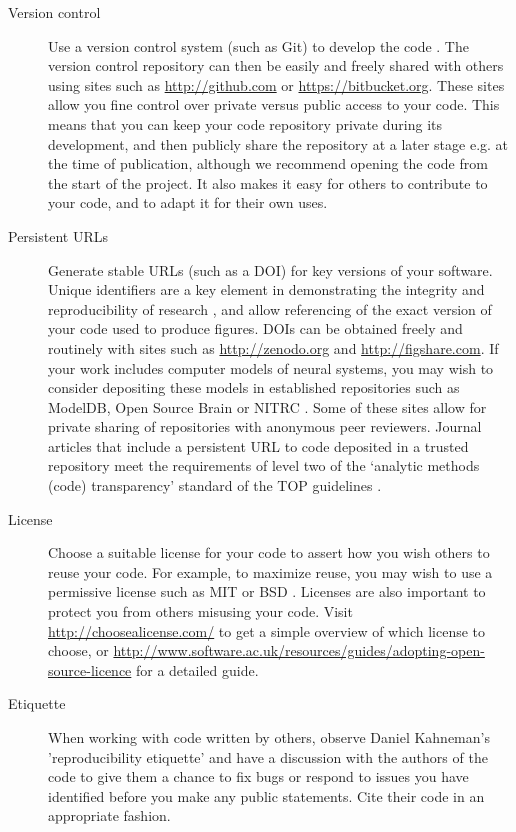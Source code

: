 \documentclass[11pt]{article}
\begin{document}
\begin{description}
\item [Version control] Use a version control system (such as Git) to
  develop the code \cite{Blischak2016}.  The version control repository
  can then be easily and freely shared with others using sites such as
  \url{http://github.com} \cite{Ram2013} or
  \url{https://bitbucket.org}.  These sites allow you fine control
  over private versus public access to your code.  This means that you
  can keep your code repository private during its development, and
  then publicly share the repository at a later stage e.g. at the time
  of publication, although we recommend opening the code from the
  start of the project.  It also makes it easy for others to
  contribute to your code, and to adapt it for their own uses.

\item [Persistent URLs] Generate stable URLs (such as a DOI) for key
  versions of your software.  Unique identifiers are a key element in
  demonstrating the integrity and reproducibility of research
  \cite{vasilevsky2013reproducibility}, and allow referencing of the
  exact version of your code used to produce figures. DOIs can be
  obtained freely and routinely with sites such as
  \url{http://zenodo.org} and \url{http://figshare.com}.  If your work
  includes computer models of neural systems, you may wish to consider
  depositing these models in established repositories such as
  ModelDB\cite{modeldb}, Open Source Brain\cite{osb} or NITRC
  \cite{poline_software_2014}. Some of these sites allow for private
  sharing of repositories with anonymous peer reviewers. Journal
  articles that include a persistent URL to code deposited in a
  trusted repository meet the requirements of level two of the
  `analytic methods (code) transparency' standard of the TOP
  guidelines \cite{Nosek2015}.


\item [License] Choose a suitable license for your code to assert how
  you wish others to reuse your code.  For example, to maximize reuse,
  you may wish to use a permissive license such as MIT or BSD
  \cite{stodden2009enabling}.  Licenses are also important to protect you from
  others misusing your code.  Visit \url{http://choosealicense.com/}
  to get a simple overview of which license to choose, or 
  \url{http://www.software.ac.uk/resources/guides/adopting-open-source-licence}
  for a detailed guide.

\item [Etiquette] When working with code written by others, observe
  Daniel Kahneman's 'reproducibility etiquette'\cite{Kahneman2014} and
  have a discussion with the authors of the code to give them a chance
  to fix bugs or respond to issues you have identified before you make
  any public statements.  Cite their code in an appropriate fashion.



\end{description}
\end{document}
